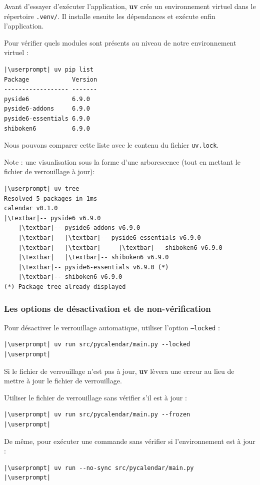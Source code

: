Avant d'essayer d'exécuter l'application, \textbf{uv} crée un environnement virtuel dans le répertoire \texttt{.venv/}. Il installe ensuite les dépendances et exécute enfin l'application.

Pour vérifier quels modules sont présents au niveau de notre environnement virtuel :
\begin{lstlisting}[style=bash]
|\userprompt| uv pip list
Package            Version
------------------ -------
pyside6            6.9.0
pyside6-addons     6.9.0
pyside6-essentials 6.9.0
shiboken6          6.9.0
\end{lstlisting}

Nous pouvons comparer cette liste avec le contenu du fichier \texttt{uv.lock}.

Note : une visualisation sous la forme d'une arborescence (tout en mettant le fichier de verrouillage à jour):
\begin{lstlisting}[style=bash]
|\userprompt| uv tree
Resolved 5 packages in 1ms
calendar v0.1.0
|\textbar|-- pyside6 v6.9.0
    |\textbar|-- pyside6-addons v6.9.0
    |\textbar|   |\textbar|-- pyside6-essentials v6.9.0
    |\textbar|   |\textbar|     |\textbar|-- shiboken6 v6.9.0
    |\textbar|   |\textbar|-- shiboken6 v6.9.0
    |\textbar|-- pyside6-essentials v6.9.0 (*)
    |\textbar|-- shiboken6 v6.9.0
(*) Package tree already displayed
\end{lstlisting}

\subsubsection*{Les options de désactivation et de non-vérification}
Pour désactiver le verrouillage automatique, utiliser l'option \texttt{--locked} :
\begin{lstlisting}[style=bash]
|\userprompt| uv run src/pycalendar/main.py --locked
|\userprompt|
\end{lstlisting}

Si le fichier de verrouillage n'est pas à jour, \textbf{uv} lèvera une erreur au lieu de mettre à jour le fichier de verrouillage.

Utiliser le fichier de verrouillage sans vérifier s'il est à jour :
\begin{lstlisting}[style=bash]
|\userprompt| uv run src/pycalendar/main.py --frozen
|\userprompt|
\end{lstlisting}

De même, pour exécuter une commande sans vérifier si l'environnement est à jour :
\begin{lstlisting}[style=bash]
|\userprompt| uv run --no-sync src/pycalendar/main.py
|\userprompt|
\end{lstlisting}

